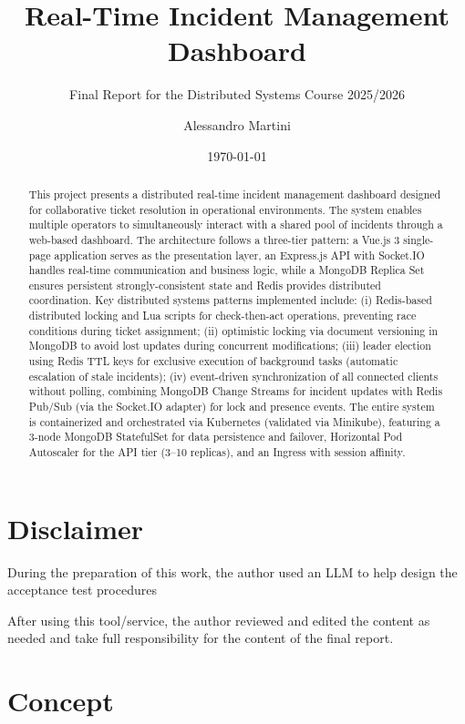 \documentclass{scrartcl}
\title{\LARGE
    Real-Time Incident Management Dashboard
}
\subtitle{Final Report for the Distributed Systems Course 2025/2026}
\author{
    Alessandro Martini \\ \emailaddr{alessandro.martini10@studio.unibo.it}
}
\date{\today}
\begin{document}
\maketitle

\begin{abstract}
    This project presents a distributed real-time incident management dashboard designed for collaborative ticket resolution in operational environments. 
    The system enables multiple operators to simultaneously interact with a shared pool of incidents through a web-based dashboard. 
    The architecture follows a three-tier pattern: a Vue.js 3 single-page application serves as the presentation layer, an Express.js API with Socket.IO handles real-time communication and business logic, while a MongoDB Replica Set ensures persistent strongly-consistent state and Redis provides distributed coordination. 
    Key distributed systems patterns implemented include: (i) Redis-based distributed locking and Lua scripts for check-then-act operations, preventing race conditions during ticket assignment; (ii) optimistic locking via document versioning in MongoDB to avoid lost updates during concurrent modifications; 
    (iii) leader election using Redis TTL keys for exclusive execution of background tasks (automatic escalation of stale incidents); (iv) event-driven synchronization of all connected clients without polling, combining MongoDB Change Streams for incident updates with Redis Pub/Sub (via the Socket.IO adapter) for lock and presence events.
    The entire system is containerized and orchestrated via Kubernetes (validated via Minikube), featuring a 3-node MongoDB StatefulSet for data persistence and failover, Horizontal Pod Autoscaler for the API tier (3--10 replicas), and an Ingress with session affinity. 
\end{abstract}

\section*{Disclaimer}

During the preparation of this work, the author used an LLM to help design the acceptance test procedures

After using this tool/service, 
the author reviewed and edited the content as needed 
and take full responsibility for the content of the final report.

\section{Concept}\label{concept}
\end{document}
